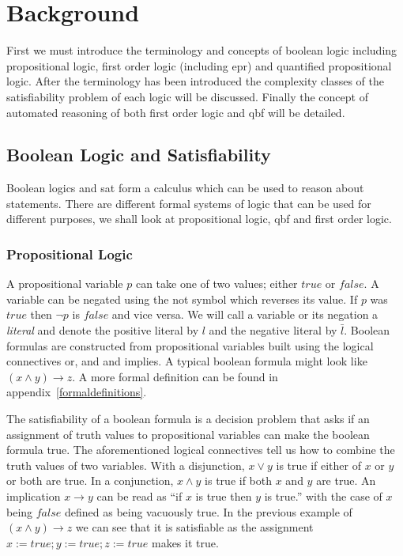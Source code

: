 \chapter{Background}
First we must introduce the terminology and concepts of boolean logic including propositional logic, first order logic (including \gls{epr}) and quantified propositional logic.
After the terminology has been introduced the complexity classes of the satisfiability problem of each logic will be discussed.
Finally the concept of automated reasoning of both first order logic and \gls{qbf} will be detailed.

\section{Boolean Logic and Satisfiability}
Boolean logics and \gls{sat} form a calculus which can be used to reason about statements. There are different formal systems of logic that can be used for different purposes, we shall look at propositional logic, \gls{qbf} and first order logic.

\subsection{Propositional Logic}
A propositional variable $p$ can take one of two values; either $true$ or $false$. A variable can be negated using the \gls{not} symbol which reverses its value. If $p$ was $true$ then $\neg p$ is $false$ and vice versa. We will call a variable or its negation a \textit{literal} and denote the positive literal by $l$ and the negative literal by $\bar{l}$.
Boolean formulas are constructed from propositional variables built using the logical connectives \gls{or}, \gls{and} and \gls{implies}. A typical boolean formula might look like $(x \land y) \to z$. A more formal definition can be found in appendix~\ref{formaldefinitions}.

The satisfiability of a boolean formula is a decision problem that asks if an assignment of truth values to propositional variables can make the boolean formula true. The aforementioned logical connectives tell us how to combine the truth values of two variables. With a disjunction, $x \lor y$ is true if either of $x$ or $y$ or both are true. In a conjunction, $x \land y$ is true if both $x$ and $y$ are true. An implication $x \to y$ can be read as ``if $x$ is true then $y$ is true.'' with the case of $x$ being $false$ defined as being vacuously true. In the previous example of $(x \land y) \to z$ we can see that it is satisfiable as the assignment $x := true; y := true; z := true$ makes it true.

